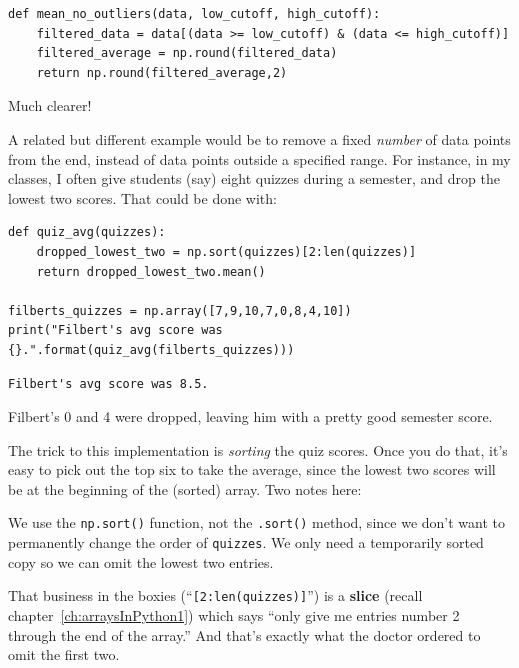 \begin{Verbatim}[fontsize=\small,samepage=true,frame=single,framesep=3mm]
def mean_no_outliers(data, low_cutoff, high_cutoff):
    filtered_data = data[(data >= low_cutoff) & (data <= high_cutoff)]
    filtered_average = np.round(filtered_data)
    return np.round(filtered_average,2)
\end{Verbatim}

Much clearer!

\medskip

A related but different example would be to remove a fixed \textit{number} of
data points from the end, instead of data points outside a specified range. For
instance, in my classes, I often give students (say) eight quizzes during a
semester, and drop the lowest two scores. That could be done with:


\begin{Verbatim}[fontsize=\small,samepage=true,frame=single,framesep=3mm]
def quiz_avg(quizzes):
    dropped_lowest_two = np.sort(quizzes)[2:len(quizzes)]
    return dropped_lowest_two.mean()

filberts_quizzes = np.array([7,9,10,7,0,8,4,10])
print("Filbert's avg score was {}.".format(quiz_avg(filberts_quizzes)))
\end{Verbatim}
\vspace{-.2in}

\begin{Verbatim}[fontsize=\small,samepage=true,frame=leftline,framesep=5mm,framerule=1mm]
Filbert's avg score was 8.5.
\end{Verbatim}

Filbert's 0 and 4 were dropped, leaving him with a pretty good semester score.

The trick to this implementation is \textit{sorting} the quiz scores. Once you
do that, it's easy to pick out the top six to take the average, since the
lowest two scores will be at the beginning of the (sorted) array. Two notes
here:


\begin{compactitem}
\item We use the \texttt{np.sort()} function, not the \texttt{.sort()} method,
since we don't want to permanently change the order of \texttt{quizzes}. We
only need a temporarily sorted copy so we can omit the lowest two entries.
\item That business in the boxies (``\texttt{[2:len(quizzes)]}'') is a
\textbf{slice} (recall chapter~\ref{ch:arraysInPython1}) which says ``only give
me entries number 2 through the end of the array.'' And that's exactly what the
doctor ordered to omit the first two.
\end{compactitem}


